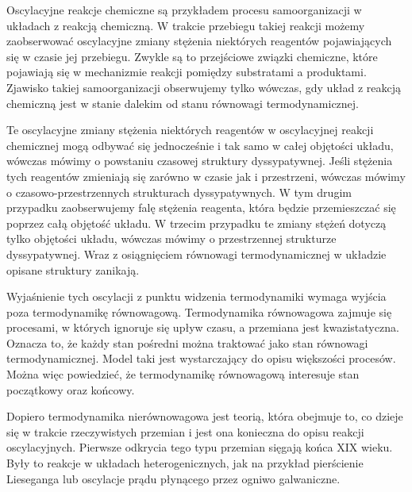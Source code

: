 \documentclass[10pt, a4paper, twoside, onecolumn]{article}
\numberwithin{equation}{section}
\begin{document}
	Oscylacyjne reakcje chemiczne są przykładem procesu samoorganizacji w układach z reakcją chemiczną. W trakcie przebiegu takiej reakcji możemy zaobserwować oscylacyjne zmiany stężenia niektórych reagentów pojawiających się w czasie jej przebiegu. Zwykle są to przejściowe związki chemiczne, które pojawiają się w mechanizmie reakcji pomiędzy substratami a produktami. Zjawisko takiej samoorganizacji obserwujemy tylko wówczas, gdy układ z reakcją chemiczną jest w stanie dalekim od stanu równowagi termodynamicznej. \par
	Te oscylacyjne zmiany stężenia niektórych reagentów w oscylacyjnej reakcji chemicznej mogą odbywać się jednocześnie i tak samo w całej objętości układu, wówczas mówimy o powstaniu czasowej struktury dyssypatywnej. Jeśli stężenia tych reagentów zmieniają się zarówno w czasie jak i przestrzeni, wówczas mówimy o czasowo-przestrzennych strukturach dyssypatywnych. W tym drugim przypadku zaobserwujemy falę stężenia reagenta, która będzie przemieszczać się poprzez całą objętość układu. W trzecim przypadku te zmiany stężeń dotyczą tylko objętości układu, wówczas mówimy o przestrzennej strukturze dyssypatywnej. Wraz z osiągnięciem równowagi termodynamicznej w układzie opisane struktury zanikają. 
	
	
	Wyjaśnienie tych oscylacji z punktu widzenia termodynamiki wymaga wyjścia poza termodynamikę równowagową. Termodynamika równowagowa zajmuje się procesami, w których ignoruje się upływ czasu, a przemiana jest kwazistatyczna. Oznacza to, że każdy stan pośredni można traktować jako stan równowagi termodynamicznej. Model taki jest wystarczający do opisu większości procesów. Można więc powiedzieć, że termodynamikę równowagową interesuje stan początkowy oraz końcowy. \par
	Dopiero termodynamika nierównowagowa jest teorią, która obejmuje to, co dzieje się w trakcie rzeczywistych przemian i jest ona konieczna do opisu reakcji oscylacyjnych. Pierwsze odkrycia tego typu przemian sięgają końca XIX wieku. Były to reakcje w układach heterogenicznych, jak na przykład pierścienie Lieseganga lub oscylacje prądu płynącego przez ogniwo galwaniczne. 
	
\end{document}
